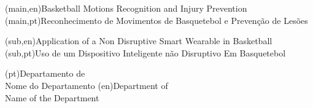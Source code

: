 
%


\nttitle(main,en){Basketball Motions Recognition and Injury Prevention}%
\nttitle(main,pt){Reconhecimento de Movimentos de Basquetebol e Prevenção de Lesões}%

\nttitle(sub,en){Application of a Non Disruptive Smart Wearable in Basketball}%
\nttitle(sub,pt){Uso de um Dispositivo Inteligente não Disruptivo Em Basquetebol}%


\ntdepartment*(pt){Departamento de\\Nome do Departamento}
\ntdepartment*(en){Department of\\Name of the Department}

